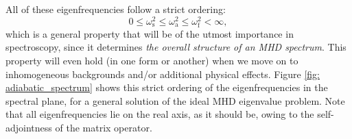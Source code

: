 All of these eigenfrequencies follow a strict ordering:
\begin{equation} \label{eq: omega_ordening}
  0 \leq \omega_\text{s}^2 \leq \omega_\text{a}^2 \leq \omega_\text{f}^2 < \infty,
\end{equation}
which is a general property that will be of the utmost importance in spectroscopy, since it determines \emph{the overall structure of an MHD spectrum}. This property will even hold (in one form or another) when we move on to inhomogeneous backgrounds and/or additional physical effects. Figure \ref{fig: adiabatic_spectrum} shows this strict ordering of the eigenfrequencies in the spectral plane, for a general solution of the ideal MHD eigenvalue problem. Note that all eigenfrequencies lie on the real axis, as it should be, owing to the self-adjointness of the matrix operator.


